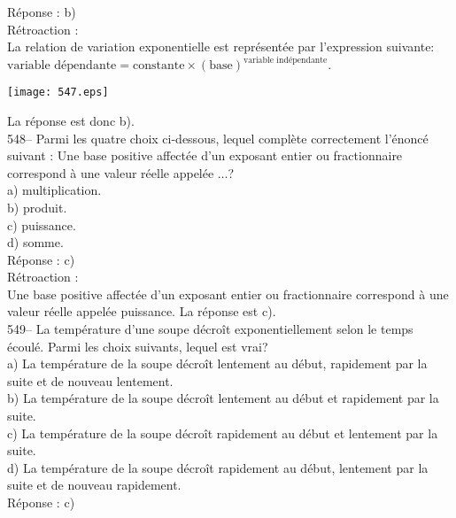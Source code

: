 ﻿\documentclass[letterpaper, 12pt]{article}
\begin{document}
R\'eponse : b)\\

R\'etroaction : \\
La relation de variation exponentielle est repr\'esent\'ee par l'expression
suivante:\\[2mm]
$\textrm{variable
d\'ependante}=\textrm{constante}\times\left(\textrm{base}\right)
^{\textrm{variable ind\'ependante}}.$\\[2mm]
   \begin{center}
    \texttt{[image: 547.eps]}
    \end{center}
La r\'eponse est donc b).\\

548-- Parmi les quatre choix ci-dessous, lequel compl\`ete
correctement l'\'enonc\'e suivant : \og Une base positive affect\'ee
d'un exposant entier ou fractionnaire correspond \`a une valeur r\'eelle appel\'ee $\ldots$\fg ?\\
a) multiplication.\\
b) produit.\\
c) puissance.\\
d) somme.\\

R\'eponse : c)\\

R\'etroaction : \\
Une base positive affect\'ee d'un exposant entier ou fractionnaire
correspond \`a une valeur r\'eelle appel\'ee puissance.  La r\'eponse est
c).\\

549-- La temp\'erature d'une soupe d\'ecro\^it  exponentiellement selon le
temps \'ecoul\'e.  Parmi les choix suivants, lequel est vrai?\\
a) La temp\'erature de la soupe d\'ecro\^it lentement au d\'ebut, rapidement
par la suite et de nouveau lentement.\\
b) La temp\'erature de la soupe d\'ecro\^it lentement au d\'ebut et
rapidement par la suite.\\
c) La temp\'erature de la soupe d\'ecro\^it rapidement au d\'ebut et
lentement par la suite.  \\
d) La temp\'erature de la soupe d\'ecro\^it rapidement au d\'ebut, lentement
par la suite et de nouveau rapidement.\\

R\'eponse : c)\\
\end{document}
